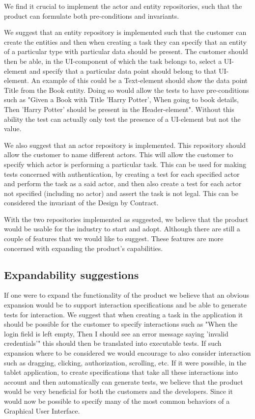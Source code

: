 We find it crucial to implement the actor and entity repositories, such that the product can formulate both pre-conditions and invariants.

We suggest that an entity repository is implemented such that the customer can create the entities and then when creating a task they can specify that an entity of a particular type with particular data should be present.
The customer should then be able, in the UI-component of which the task belongs to, select a UI-element and specify that a particular data point should belong to that UI-element.
An example of this could be a Text-element should show the data point Title from the Book entity.
Doing so would allow the tests to have pre-conditions such as "Given a Book with Title 'Harry Potter', When going to book details, Then 'Harry Potter' should be present in the Header-element".
Without this ability the test can actually only test the presence of a UI-element but not the value.

We also suggest that an actor repository is implemented.
This repository should allow the customer to name different actors.
This will allow the customer to specify which actor is performing a particular task.
This can be used for making tests concerned with authentication, by creating a test for each specified actor and perform the task as a said actor, and then also create a test for each actor not specified (including no actor) and assert the task is not legal.
This can be considered the invariant of the Design by Contract.

With the two repositories implemented as suggested, we believe that the product would be usable for the industry to start and adopt.
Although there are still a couple of features that we would like to suggest.
These features are more concerned with expanding the product's capabilities.

\subsection{Expandability suggestions}
If one were to expand the functionality of the product we believe that an obvious expansion would be to support interaction specifications and be able to generate tests for interaction.
We suggest that when creating a task in the application it should be possible for the customer to specify interactions such as "When the login field is left empty, Then I should see an error message saying 'invalid credentials'" this should then be translated into executable tests. 
If such expansion where to be considered we would encourage to also consider interaction such as dragging, clicking, authorization, scrolling, etc.
If it were possible, in the tablet application, to create specifications that take all these interactions into account and then automatically can generate tests, we believe that the product would be very beneficial for both the customers and the developers.
Since it would now be possible to specify many of the most common behaviors of a Graphical User Interface.


